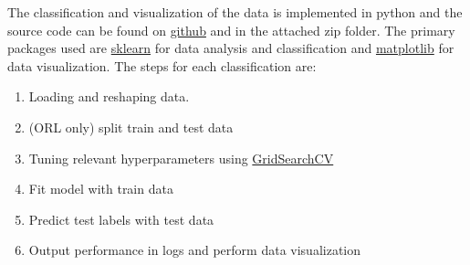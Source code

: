 The classification and visualization of the data is implemented in python and the source code can be found on \href{https://github.com/mlRosenquist/oda-project-assignment/tree/master/source}{github} and in the attached zip folder. The primary packages used are \href{https://scikit-learn.org/stable/index.html}{sklearn} for data analysis and classification and \href{https://matplotlib.org/}{matplotlib} for data visualization. The steps for each classification are: 

\begin{enumerate}
    \item Loading and reshaping data. 
    \item (ORL only) split train and test data
    \item Tuning relevant hyperparameters using \href{https://scikit-learn.org/stable/modules/generated/sklearn.model_selection.GridSearchCV.html}{GridSearchCV}
    \item Fit model with train data
    \item Predict test labels with test data
    \item Output performance in logs and perform data visualization
\end{enumerate}